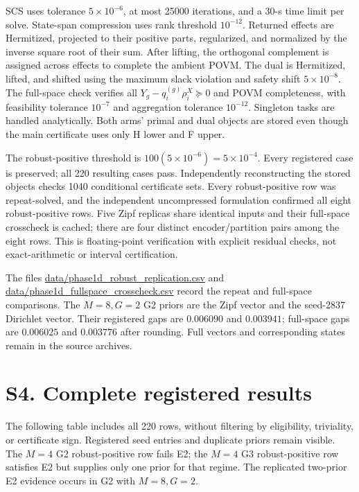 \documentclass[10pt]{article}
\newcommand{\suppsection}[1]{\section*{#1}}
\begin{document}
SCS uses tolerance $5\times10^{-6}$, at most 25000 iterations, and a 30-s time limit per solve. State-span compression uses rank threshold $10^{-12}$. Returned effects are Hermitized, projected to their positive parts, regularized, and normalized by the inverse square root of their sum. After lifting, the orthogonal complement is assigned across effects to complete the ambient POVM. The dual is Hermitized, lifted, and shifted using the maximum slack violation and safety shift $5\times10^{-8}$. The full-space check verifies all $Y_g-q_i^{(g)}\rho_i^X\succeq0$ and POVM completeness, with feasibility tolerance $10^{-7}$ and aggregation tolerance $10^{-12}$. Singleton tasks are handled analytically. Both arms' primal and dual objects are stored even though the main certificate uses only H lower and F upper.

The robust-positive threshold is $100(5\times10^{-6})=5\times10^{-4}$. Every registered case is preserved; all 220 resulting cases pass. Independently reconstructing the stored objects checks 1040 conditional certificate sets. Every robust-positive row was repeat-solved, and the independent uncompressed formulation confirmed all eight robust-positive rows. Five Zipf replicas share identical inputs and their full-space crosscheck is cached; there are four distinct encoder/partition pairs among the eight rows. This is floating-point verification with explicit residual checks, not exact-arithmetic or interval certification.

The files \url{data/phase1d_robust_replication.csv} and \url{data/phase1d_fullspace_crosscheck.csv} record the repeat and full-space comparisons. The $M=8,G=2$ G2 priors are the Zipf vector and the seed-2837 Dirichlet vector. Their registered gaps are $0.006090$ and $0.003941$; full-space gaps are $0.006025$ and $0.003776$ after rounding. Full vectors and corresponding states remain in the source archives.

\suppsection{S4. Complete registered results}
The following table includes all 220 rows, without filtering by eligibility, triviality, or certificate sign. Registered seed entries and duplicate priors remain visible. The $M=4$ G2 robust-positive row fails E2; the $M=4$ G3 robust-positive row satisfies E2 but supplies only one prior for that regime. The replicated two-prior E2 evidence occurs in G2 with $M=8,G=2$.
\begin{landscape}\scriptsize

\end{landscape}
\end{document}
